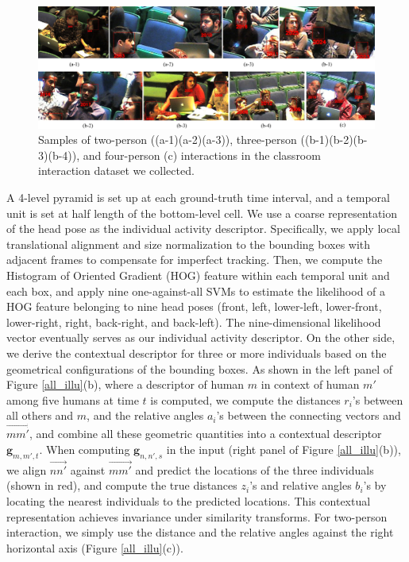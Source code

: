 \begin{figure}[t]
\begin{center}
\includegraphics[scale=1.2]{dataset.png}
\end{center}
\caption{Samples of two-person ((a-1)(a-2)(a-3)), three-person ((b-1)(b-2)(b-3)(b-4)), and four-person (c) interactions in the classroom interaction dataset we collected.}
\label{dataset}
\end{figure}



A 4-level pyramid is set up at each ground-truth time interval, and a temporal unit is set at half length of the bottom-level cell. We use a coarse representation of the head pose as the individual activity descriptor. Specifically, we apply local translational alignment and size normalization to the bounding boxes with adjacent frames to compensate for imperfect tracking. Then, we compute the Histogram of Oriented Gradient (HOG) feature within each temporal unit and each box, and apply nine one-against-all SVMs to estimate the likelihood of a HOG feature belonging to nine head poses (front, left, lower-left, lower-front, lower-right, right, back-right, and back-left). The nine-dimensional likelihood vector eventually serves as our individual activity descriptor. On the other side, we derive the contextual descriptor for three or more individuals based on the geometrical configurations of the bounding boxes. As shown in the left panel of Figure \ref{all_illu}(b), where a descriptor of human $m$ in context of human $m'$ among five humans at time $t$ is computed, we compute the distances $r_{i}$'s between all others and $m$, and the relative angles $a_{i}$'s between the connecting vectors and $\overrightarrow{mm'}$, and combine all these geometric quantities into a contextual descriptor $\mathbf{g}_{m,m',t}$. When computing $\mathbf{g}_{n,n',s}$ in the input (right panel of Figure \ref{all_illu}(b)), we align $\overrightarrow{nn'}$ against $\overrightarrow{mm'}$ and predict the locations of the three individuals (shown in red), and compute the true distances $z_{i}$'s and relative angles $b_{i}$'s by locating the nearest individuals to the predicted locations. This contextual representation achieves invariance under similarity transforms. For two-person interaction, we simply use the distance and the relative angles against the right horizontal axis (Figure \ref{all_illu}(c)). 

